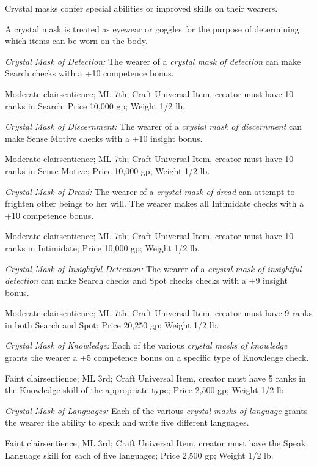 \documentclass{article}
\begin{document}
Crystal masks confer special abilities or improved skills on their wearers.

A crystal mask is treated as eyewear or goggles for the purpose of determining 
which items can be worn on the body.

\textit{Crystal Mask of Detection: }The wearer of a \textit{crystal mask of detection 
}can make Search checks with a +10 competence bonus.

Moderate clairsentience; ML 7th; Craft Universal Item, creator must have 10 ranks 
in Search; Price 10,000 gp; Weight 1/2 lb.

\textit{Crystal Mask of Discernment: }The wearer of a \textit{crystal mask of discernment 
}can make Sense Motive checks with a +10 insight bonus.

Moderate clairsentience; ML 7th; Craft Universal Item, creator must have 10 ranks 
in Sense Motive; Price 10,000 gp; Weight 1/2 lb.

\textit{Crystal Mask of Dread: }The wearer of a \textit{crystal mask of dread }can 
attempt to frighten other beings to her will. The wearer makes all Intimidate checks 
with a +10 competence bonus. 

Moderate clairsentience; ML 7th; Craft Universal Item, creator must have 10 ranks 
in Intimidate; Price 10,000 gp; Weight 1/2 lb.

\textit{Crystal Mask of Insightful Detection: }The wearer of a \textit{crystal 
mask of insightful detection }can make Search checks and Spot checks checks with 
a +9 insight bonus.

Moderate clairsentience; ML 7th; Craft Universal Item, creator must have 9 ranks 
in both Search and Spot; Price 20,250 gp; Weight 1/2 lb.

\textit{Crystal Mask of Knowledge: }Each of the various \textit{crystal masks of 
knowledge }grants the wearer a +5 competence bonus on a specific type of Knowledge 
check. 

Faint clairsentience; ML 3rd; Craft Universal Item, creator must have 5 ranks in 
the Knowledge skill of the appropriate type; Price 2,500 gp; Weight 1/2 lb.

\textit{Crystal Mask of Languages: }Each of the various \textit{crystal masks of 
language }grants the wearer the ability to speak and write five different languages. 

Faint clairsentience; ML 3rd; Craft Universal Item, creator must have the Speak 
Language skill for each of five languages; Price 2,500 gp; Weight 1/2 lb.
\end{document}
